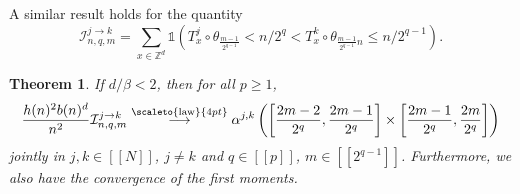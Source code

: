 \documentclass[12pt]{article}
\newcommand{\1}{\mathds{1}}
\newcommand{\ZZ}{\mathbb Z}
\newcommand{\distribution}{\stackrel{\scaleto{\mathrm{law}}{4pt}}{\longrightarrow}}
\newtheorem{theorem}{Theorem}
\numberwithin{equation}{section}
\begin{document}
A similar result holds for the quantity 
\begin{equation*}
    \mathcal I_{n,q,m}^{j\rightarrow k}=\sum_{x\in\ZZ^d}\1\left(T_x^j\circ\theta_{\frac{m-1}{2^{q-1}}}<n/2^q<T_x^k\circ\theta_{\frac{m-1}{2^{q-1}}n}\le n/2^{q-1}\right).
\end{equation*} 

\begin{theorem}
\label{theorem:joint convergence of the I_(n,q,m)^(j->k)}
    If $d/\beta<2$, then for all $p\ge1$,
    \begin{equation*}
        \frac{h(n)^2b(n)^d}{n^2}\mathcal I_{n,q,m}^{j\rightarrow k}\distribution\alpha^{j,k}\left(\left[\frac{2m-2}{2^q},\frac{2m-1}{2^q}\right]\times\left[\frac{2m-1}{2^q},\frac{2m}{2^q}\right]\right)
    \end{equation*}
    jointly in $j,k\in[\![N]\!]$, $j\ne k$ and $q\in[\![p]\!]$, $m\in[\![2^{q-1}]\!]$. Furthermore, we also have the convergence of the first moments.
\end{theorem}
\end{document}
